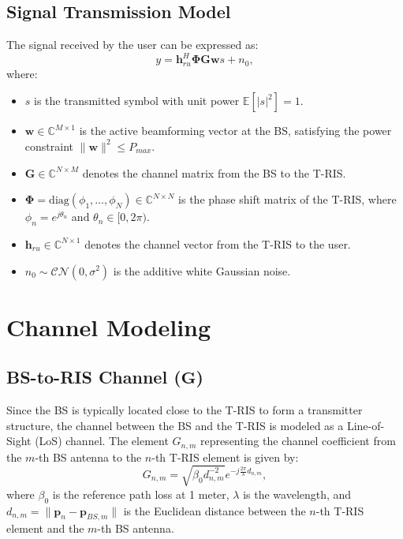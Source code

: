 \documentclass[journal,comsoc]{IEEEtran}
\begin{document}
\subsection{Signal Transmission Model}
The signal received by the user can be expressed as:
\begin{equation}
	y = \mathbf{h}_{ru}^H \boldsymbol{\Phi} \mathbf{G} \mathbf{w} s + n_0,
\end{equation}
where:
\begin{itemize}
	\item $s$ is the transmitted symbol with unit power $\mathbb{E}[|s|^2]=1$.
	\item $\mathbf{w} \in \mathbb{C}^{M \times 1}$ is the active beamforming vector at the BS, satisfying the power constraint $\|\mathbf{w}\|^2 \le P_{max}$.
	\item $\mathbf{G} \in \mathbb{C}^{N \times M}$ denotes the channel matrix from the BS to the T-RIS.
	\item $\boldsymbol{\Phi} = \mathrm{diag}(\phi_1, \dots, \phi_N) \in \mathbb{C}^{N \times N}$ is the phase shift matrix of the T-RIS, where $\phi_n = e^{j \theta_n}$ and $\theta_n \in [0, 2\pi)$.
	\item $\mathbf{h}_{ru} \in \mathbb{C}^{N \times 1}$ denotes the channel vector from the T-RIS to the user.
	\item $n_0 \sim \mathcal{CN}(0, \sigma^2)$ is the additive white Gaussian noise.
\end{itemize}

\section{Channel Modeling}

\subsection{BS-to-RIS Channel ($\mathbf{G}$)}
Since the BS is typically located close to the T-RIS to form a transmitter structure, the channel between the BS and the T-RIS is modeled as a Line-of-Sight (LoS) channel. The element $G_{n,m}$ representing the channel coefficient from the $m$-th BS antenna to the $n$-th T-RIS element is given by:
\begin{equation}
	G_{n,m} = \sqrt{\beta_0 d_{n,m}^{-2}} e^{-j \frac{2\pi}{\lambda} d_{n,m}},
\end{equation}
where $\beta_0$ is the reference path loss at 1 meter, $\lambda$ is the wavelength, and $d_{n,m} = \|\mathbf{p}_n - \mathbf{p}_{BS,m}\|$ is the Euclidean distance between the $n$-th T-RIS element and the $m$-th BS antenna.
\end{document}
